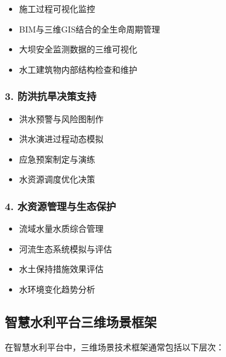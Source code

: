 \begin{itemize}
\tightlist
\item
  施工过程可视化监控
\item
  BIM与三维GIS结合的全生命周期管理
\item
  大坝安全监测数据的三维可视化
\item
  水工建筑物内部结构检查和维护
\end{itemize}

\subsubsection{3.
防洪抗旱决策支持}\label{ux9632ux6d2aux6297ux65f1ux51b3ux7b56ux652fux6301}

\begin{itemize}
\tightlist
\item
  洪水预警与风险图制作
\item
  洪水演进过程动态模拟
\item
  应急预案制定与演练
\item
  水资源调度优化决策
\end{itemize}

\subsubsection{4.
水资源管理与生态保护}\label{ux6c34ux8d44ux6e90ux7ba1ux7406ux4e0eux751fux6001ux4fddux62a4}

\begin{itemize}
\tightlist
\item
  流域水量水质综合管理
\item
  河流生态系统模拟与评估
\item
  水土保持措施效果评估
\item
  水环境变化趋势分析
\end{itemize}

\subsection{智慧水利平台三维场景框架}\label{ux667aux6167ux6c34ux5229ux5e73ux53f0ux4e09ux7ef4ux573aux666fux6846ux67b6}

在智慧水利平台中，三维场景技术框架通常包括以下层次：


